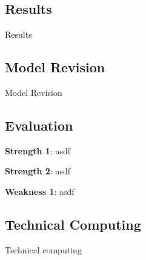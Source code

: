 \subsection{Results}
Results

\subsection{Model Revision}
Model Revision

\subsection{Evaluation}

\noindent\textbf{Strength 1}: asdf

\noindent\textbf{Strength 2}: asdf

\noindent\textbf{Weakness 1}: asdf

\subsection{Technical Computing}
Technical computing
